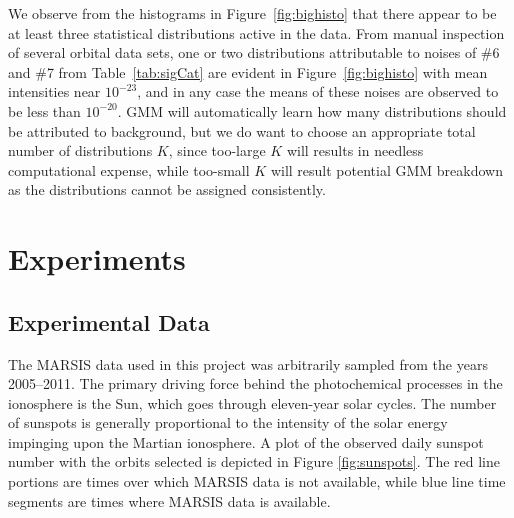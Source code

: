 We observe from the histograms in Figure~\ref{fig:bighisto} that there appear to be at least three statistical distributions active in the data.
From manual inspection of several orbital data sets, one or two distributions attributable to noises of \#6 and \#7 from Table~\ref{tab:sigCat} are evident in Figure~\ref{fig:bighisto} with mean intensities near $10^{-23}$, and in any case the means of these noises are observed to be less than $10^{-20}$. 
GMM will automatically learn how many distributions should be attributed to background, but we do want to choose an appropriate total number of distributions $K$, since too-large $K$ will results in needless computational expense, while too-small $K$ will result potential GMM breakdown as the distributions cannot be assigned consistently.

\section{Experiments}
\subsection{Experimental Data}
The MARSIS data used in this project was arbitrarily sampled from the years 2005--2011. 
The primary driving force behind the photochemical processes in the ionosphere is the Sun, which goes through eleven-year solar cycles. 
The number of sunspots is generally proportional to the intensity of the solar energy impinging upon the Martian ionosphere. 
A plot of the observed daily sunspot number with the orbits selected is depicted in Figure \ref{fig:sunspots}.
The red line portions are times over which MARSIS data is not available, while blue line time segments are times where MARSIS data is available.

